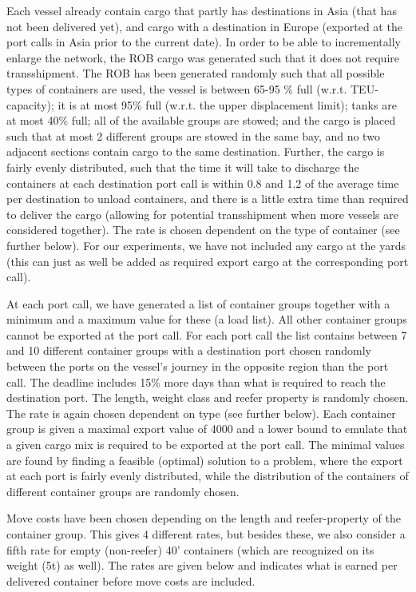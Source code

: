 Each vessel already contain cargo that partly has destinations in Asia (that has not been delivered yet), and cargo with a destination in Europe (exported at the port calls in Asia prior to the current date). In order to be able to incrementally enlarge the network, the ROB cargo was generated such that it does not require transshipment. The ROB has been generated randomly such that all possible types of containers are used, the vessel is between 65-95 \% full (w.r.t. TEU-capacity); it is at most 95\% full (w.r.t. the upper displacement limit); tanks are at most 40\% full; all of the available groups are stowed; and the cargo is placed such that at most 2 different groups are stowed in the same bay, and no two adjacent sections contain cargo to the same destination. Further, the cargo is fairly evenly distributed, such that the time it will take to discharge the containers at each destination port call is within 0.8 and 1.2 of the average time per destination to unload containers, and there is a little extra time than required to deliver the cargo (allowing for potential transshipment when more vessels are considered together). The rate is chosen dependent on the type of container (see further below).
For our experiments, we have not included any cargo at the yards (this can just as well be added as required export cargo at the corresponding port call).

At each port call, we have generated a list of container groups together with a minimum and a maximum value for these (a load list). All other container groups cannot be exported at the port call. For each port call the list contains between 7 and 10 different container groups with a destination port chosen randomly between the ports on the vessel's journey in the opposite region than the port call. The deadline includes 15\% more days than what is required to reach the destination port. The length, weight class and reefer property is randomly chosen. The rate is again chosen dependent on type (see further below).  
Each container group is given a maximal export value of 4000 and a lower bound to emulate that a given cargo mix is required to be exported at the port call. The minimal values are found by finding a feasible (optimal) solution to a problem, where the export at each port is fairly evenly distributed, while the distribution of the containers of different container groups are randomly chosen. 

Move costs have been chosen depending on the length and reefer-property of the container group. This gives 4 different rates, but besides these, we also consider a fifth rate for empty (non-reefer) 40' containers (which are recognized on its weight (5t) as well). %
The rates are given below and indicates what is earned per delivered container before move costs are included. %

